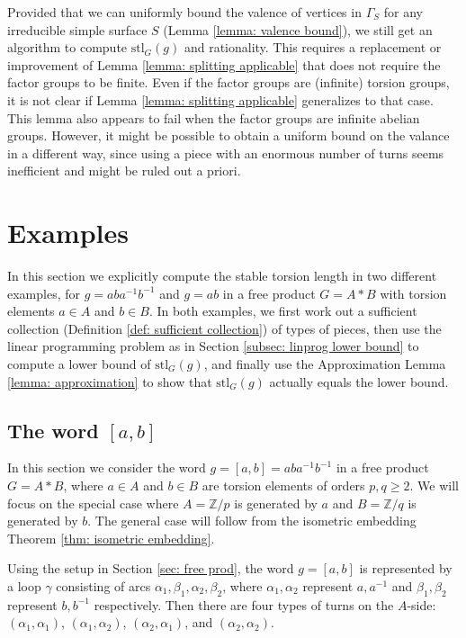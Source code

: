\documentclass{amsart}
\theoremstyle{definition}
\numberwithin{equation}{section}
\theoremstyle{theorem}
\theoremstyle{remark}
\def\Z{\mathbb Z}
\def\stl{\mathrm{stl}}
\begin{document}
	Provided that we can uniformly bound the valence of vertices in $\Gamma_S$ for any irreducible simple surface $S$ (Lemma \ref{lemma: valence bound}), we still get an algorithm to compute $\stl_G(g)$ and rationality.
	This requires a replacement or improvement of Lemma \ref{lemma: splitting applicable} that does not require the factor groups to be finite. Even if the factor groups are (infinite) torsion groups, it is not clear if Lemma \ref{lemma: splitting applicable} generalizes to that case. This lemma also appears to fail when the factor groups are infinite abelian groups.
	However, it might be possible to obtain a uniform bound on the valance in a different way, since using a piece with an enormous number of turns seems inefficient and might be ruled out a priori.

	
	\section{Examples} \label{sec: examples}
	In this section we explicitly compute the stable torsion length in two different examples, for $g=aba^{-1}b^{-1}$ and $g=ab$ in a free product $G=A*B$ with torsion elements $a\in A$ and $b\in B$. In both examples, we first work out a sufficient collection (Definition \ref{def: sufficient collection}) of types of pieces, then use the linear programming problem as in Section \ref{subsec: linprog lower bound} to compute a lower bound of $\stl_G(g)$, and finally use the Approximation Lemma \ref{lemma: approximation} to show that $\stl_G(g)$ actually equals the lower bound.
	
	\subsection{The word $[a,b]$}
	In this section we consider the word $g=[a,b]=aba^{-1}b^{-1}$ in a free product $G=A*B$, where $a\in A$ and $b\in B$ are torsion elements of orders $p,q\ge2$. We will focus on the special case where $A=\Z/p$ is generated by $a$ and $B=\Z/q$ is generated by $b$. The general case will follow from the isometric embedding Theorem \ref{thm: isometric embedding}.
	
	Using the setup in Section \ref{sec: free prod}, the word $g=[a,b]$ is represented by a loop $\gamma$ consisting of arcs $\alpha_1,\beta_1,\alpha_2,\beta_2$, where $\alpha_1,\alpha_2$ represent $a,a^{-1}$ and $\beta_1,\beta_2$ represent $b,b^{-1}$ respectively. Then there are four types of turns on the $A$-side: $(\alpha_1,\alpha_1)$, $(\alpha_1,\alpha_2)$, $(\alpha_2,\alpha_1)$, and $(\alpha_2,\alpha_2)$.
	
\end{document}
